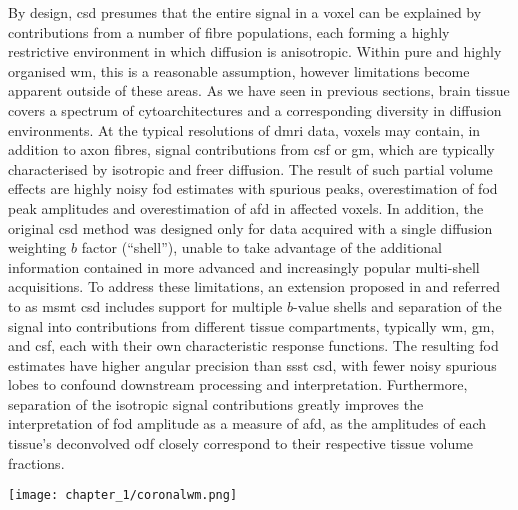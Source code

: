 By design, \gls{csd} presumes that the entire signal in a voxel can be explained by contributions from a number of fibre populations, each forming a highly restrictive environment in which diffusion is anisotropic.
Within pure and highly organised \gls{wm}, this is a reasonable assumption, however limitations become apparent outside of these areas.
As we have seen in previous sections, brain tissue covers a spectrum of cytoarchitectures and a corresponding diversity in diffusion environments.
At the typical resolutions of \gls{dmri} data, voxels may contain, in addition to axon fibres, signal contributions from \gls{csf} or \gls{gm}, which are typically characterised by isotropic and freer diffusion.
The result of such partial volume effects are highly noisy \gls{fod} estimates with spurious peaks, overestimation of \gls{fod} peak amplitudes and overestimation of \gls{afd} in affected voxels.\autocite{Jeurissen2014}
In addition, the original \gls{csd} method was designed only for data acquired with a single diffusion weighting $b$ factor (``shell''), unable to take advantage of the additional information contained in more advanced and increasingly popular multi-shell acquisitions.
To address these limitations, an extension proposed in \textcite{Jeurissen2014} and referred to as \gls{msmt} \gls{csd} includes support for multiple $b$-value shells and separation of the signal into contributions from different tissue compartments, typically \gls{wm}, \gls{gm}, and \gls{csf}, each with their own characteristic response functions.
The resulting \gls{fod} estimates have higher angular precision than \gls{ssst} \gls{csd}, with fewer noisy spurious lobes to confound downstream processing and interpretation.
Furthermore, separation of the isotropic signal contributions greatly improves the interpretation of \gls{fod} amplitude as a measure of \gls{afd}, as the amplitudes of each tissue's deconvolved \gls{odf} closely correspond to their respective tissue volume fractions\autocite{Jeurissen2014}.

\begin{SCfigure}
  \texttt{[image: chapter\_1/coronalwm.png]}
  \caption{Coronal section of the author's white matter, imaged with \gls{csd} \gls{dec} mapping and streamline tractography. The \glspl{cst} are visible radiating from the cortex to converge in the internal capsules before descending through the anterior pons, perpendicular to the middle cerebellar peduncle fibres. Either side of the pons, the trigeminal nerves (cranial nerve V) are visible as small green dots.}
  \label{fig:corwm}
\end{SCfigure}

